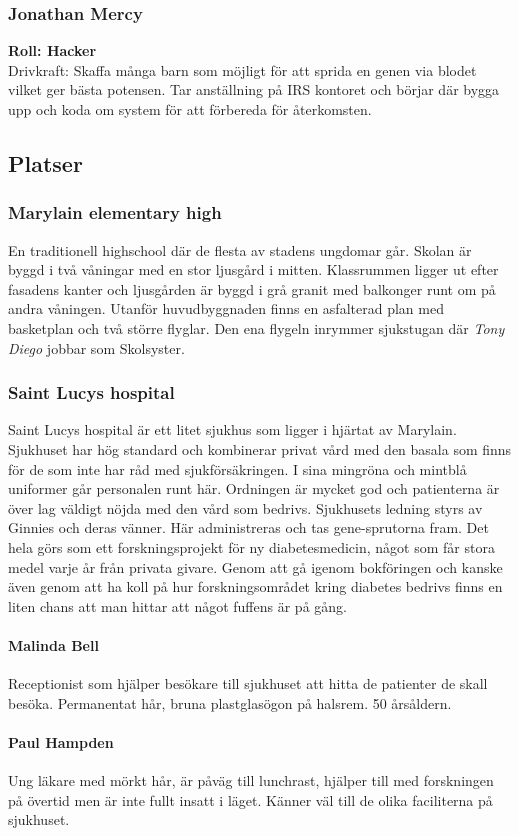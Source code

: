 \subsubsection{Jonathan Mercy}
\textbf{Roll: Hacker}\\
Drivkraft: Skaffa många barn som möjligt för att sprida en genen via blodet vilket ger bästa potensen. Tar anställning på IRS kontoret och börjar där bygga upp och koda om system för att förbereda för återkomsten.
\subsection{Platser}
\subsubsection{Marylain elementary high}
En traditionell highschool där de flesta av stadens ungdomar går. Skolan är byggd i två våningar med en stor ljusgård i mitten. Klassrummen ligger ut efter fasadens kanter och ljusgården är byggd i grå granit med balkonger runt om på andra våningen. Utanför huvudbyggnaden finns en asfalterad plan med basketplan och två större flyglar. Den ena flygeln inrymmer sjukstugan där \textit{Tony Diego} jobbar som Skolsyster.
\subsubsection{Saint Lucys hospital}
Saint Lucys hospital är ett litet sjukhus som ligger i hjärtat av Marylain. Sjukhuset har hög standard och kombinerar privat vård med den basala som finns för de som inte har råd med sjukförsäkringen. I sina mingröna och mintblå uniformer går personalen runt här. Ordningen är mycket god och patienterna är över lag väldigt nöjda med den vård som bedrivs. Sjukhusets ledning styrs av Ginnies och deras vänner. Här administreras och tas gene-sprutorna fram. Det hela görs som ett forskningsprojekt för ny diabetesmedicin, något som får stora medel varje år från privata givare. Genom att gå igenom bokföringen och kanske även genom att ha koll på hur forskningsområdet kring diabetes bedrivs finns en liten chans att man hittar att något fuffens är på gång.
\paragraph{Malinda Bell}
Receptionist som hjälper besökare till sjukhuset att hitta de patienter de skall besöka. Permanentat hår, bruna plastglasögon på halsrem. 50 årsåldern.
\paragraph{Paul Hampden}
Ung läkare med mörkt hår, är påväg till lunchrast, hjälper till med forskningen på övertid men är inte fullt insatt i läget. Känner väl till de olika faciliterna på sjukhuset.
